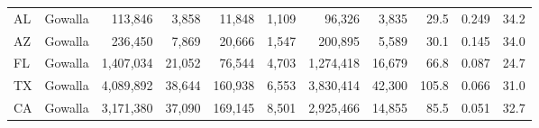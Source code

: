 \begin{table}[htbp]
\begin{adjustbox}{max width=\textwidth}
\begin{tabular}{l l r r r r r r r r r}
AL       & Gowalla       &   113{,}846 &  3{,}858 &  11{,}848 & 1{,}109 &    96{,}326 & 3{,}835 &  29.5 & 0.249 & 34.2 \\
AZ       & Gowalla       &   236{,}450 &  7{,}869 &  20{,}666 & 1{,}547 &   200{,}895 & 5{,}589 &  30.1 & 0.145 & 34.0 \\
FL       & Gowalla       & 1{,}407{,}034 & 21{,}052 &  76{,}544 & 4{,}703 & 1{,}274{,}418 & 16{,}679 &  66.8 & 0.087 & 24.7 \\
TX       & Gowalla       & 4{,}089{,}892 & 38{,}644 & 160{,}938 & 6{,}553 & 3{,}830{,}414 & 42{,}300 & 105.8 & 0.066 & 31.0 \\
CA       & Gowalla       & 3{,}171{,}380 & 37{,}090 & 169{,}145 & 8{,}501 & 2{,}925{,}466 & 14{,}855 &  85.5 & 0.051 & 32.7 \\
\bottomrule
\end{tabular}
\end{adjustbox}
\end{table}

